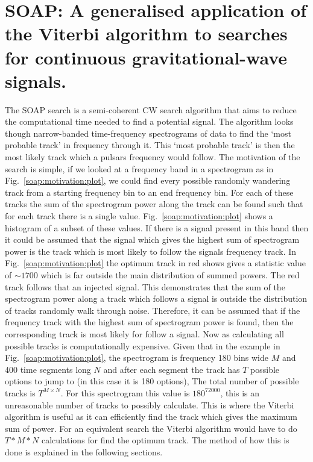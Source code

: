 \chapter{\label{soap} SOAP: A generalised application of the Viterbi algorithm to searches for continuous gravitational-wave signals.}

The SOAP search is a semi-coherent \gls{CW} search algorithm that aims to reduce the computational time needed to find a potential signal. 
The algorithm looks though narrow-banded time-frequency spectrograms of data to find the `most probable track' in frequency through it.
This `most probable track' is then the most likely track which a pulsars frequency would follow.
The motivation of the search is simple, if we looked at a frequency band in a spectrogram as in Fig.~\ref{soap:motivation:plot}, we could find every possible randomly wandering track from a starting frequency bin to an end frequency bin. For each of these tracks the sum of the spectrogram power along the track can be found such that for each track there is a single value. Fig.~\ref{soap:motivation:plot} shows a histogram of a subset of these values. If there is a signal present in this band then it could be assumed that the signal which gives the highest sum of spectrogram power is the track which is most likely to follow the signals frequency track. 
In Fig.~\ref{soap:motivation:plot} the optimum track in red shows gives a statistic value of $\sim 1700$ which is far outside the main distribution of summed powers. 
The red track follows that an injected signal.
This demonstrates that the sum of the spectrogram power along a track which follows a signal is outside the distribution of tracks randomly walk through noise. 
Therefore, it can be assumed that if the frequency track with the highest sum of spectrogram power is found, then the corresponding track is most likely for follow a signal. 
Now as calculating all possible tracks is computationally expensive. Given that in the example in Fig.~\ref{soap:motivation:plot}, the spectrogram is frequency 180 bins wide $M$ and 400 time segments long $N$ and after each segment the track has $T$ possible options to jump to (in this case it is 180 options), The total number of possible tracks is $T^{M \times N}$. For this spectrogram this value is $180^{72000}$, this is an unreasonable number of tracks to possibly calculate. This is where the Viterbi algorithm \citep{viterbi1967ErrorBounds} is useful as it can efficiently find the track which gives the maximum sum of power. For an equivalent search the Viterbi algorithm would have to do $T*M*N$ calculations for find the optimum track. The method of how this is done is explained in the following sections.

